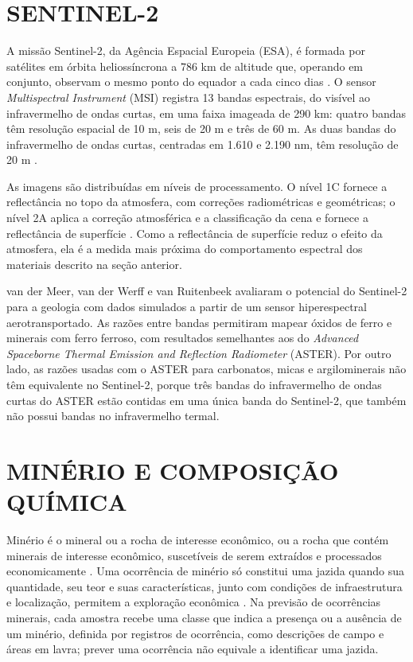\section{SENTINEL-2}

A missão Sentinel-2, da Agência Espacial Europeia (ESA), é formada por satélites em órbita heliossíncrona a 786 km de altitude que, operando em conjunto, observam o mesmo ponto do equador a cada cinco dias \cite{drusch2012}. O sensor \textit{Multispectral Instrument} (MSI) registra 13 bandas espectrais, do visível ao infravermelho de ondas curtas, em uma faixa imageada de 290 km: quatro bandas têm resolução espacial de 10 m, seis de 20 m e três de 60 m. As duas bandas do infravermelho de ondas curtas, centradas em 1.610 e 2.190 nm, têm resolução de 20 m \cite{esa2026a}.

As imagens são distribuídas em níveis de processamento. O nível 1C fornece a reflectância no topo da atmosfera, com correções radiométricas e geométricas; o nível 2A aplica a correção atmosférica e a classificação da cena e fornece a reflectância de superfície \cite{esa2026b}. Como a reflectância de superfície reduz o efeito da atmosfera, ela é a medida mais próxima do comportamento espectral dos materiais descrito na seção anterior.

van der Meer, van der Werff e van Ruitenbeek \cite{vandermeer2014} avaliaram o potencial do Sentinel-2 para a geologia com dados simulados a partir de um sensor hiperespectral aerotransportado. As razões entre bandas permitiram mapear óxidos de ferro e minerais com ferro ferroso, com resultados semelhantes aos do \textit{Advanced Spaceborne Thermal Emission and Reflection Radiometer} (ASTER). Por outro lado, as razões usadas com o ASTER para carbonatos, micas e argilominerais não têm equivalente no Sentinel-2, porque três bandas do infravermelho de ondas curtas do ASTER estão contidas em uma única banda do Sentinel-2, que também não possui bandas no infravermelho termal.

\section{MINÉRIO E COMPOSIÇÃO QUÍMICA}

Minério é o mineral ou a rocha de interesse econômico, ou a rocha que contém minerais de interesse econômico, suscetíveis de serem extraídos e processados economicamente \cite{winge2018a}. Uma ocorrência de minério só constitui uma jazida quando sua quantidade, seu teor e suas características, junto com condições de infraestrutura e localização, permitem a exploração econômica \cite{winge2018c}. Na previsão de ocorrências minerais, cada amostra recebe uma classe que indica a presença ou a ausência de um minério, definida por registros de ocorrência, como descrições de campo e áreas em lavra; prever uma ocorrência não equivale a identificar uma jazida.

